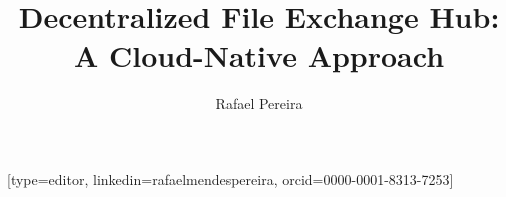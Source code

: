 \documentclass[a4paper,fleqn]{cas-dc}
\begin{document}
\let\WriteBookmarks\relax
\def\floatpagepagefraction{1}
\def\textpagefraction{.001}


\title [mode = title]{Decentralized File Exchange Hub: A Cloud-Native Approach}                     


\author[1]{Rafael Pereira}[type=editor,
                        linkedin=rafaelmendespereira,
                        orcid=0000-0001-8313-7253]
   
\address[1]{Computer Science and Communications Research Centre, School of Technology and Management, Polytechnic of Leiria, 2411-901 Leiria, Portugal}
\end{document}
